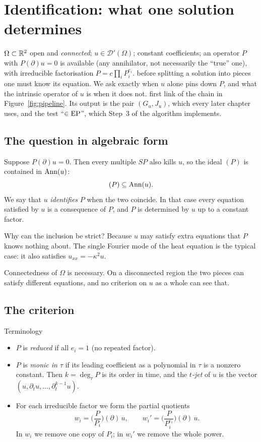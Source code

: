 \section{Identification: what one solution determines}\label{f:ch:ident}
\sectionbrief
{$\Omega\subset\mathbb{R}^2$ open and \emph{connected}; $u\in\mathcal D'(\Omega)$; constant coefficients; an operator $P$ with $P(\partial)u=0$ is available (any annihilator, not necessarily the ``true'' one), with irreducible factorisation $P=c\prod_iP_i^{e_i}$.}
{before splitting a solution into pieces one must know its equation. We ask exactly when $u$ alone pins down $P$, and what the intrinsic operator of $u$ is when it does not.}
{first link of the chain in Figure~\ref{fig:pipeline}. Its output is the pair $(G_u,J_u)$, which every later chapter uses, and the test ``$\in\mathrm{EP}$'', which Step~3 of the algorithm implements.}

\subsection{The question in algebraic form}

Suppose $P(\partial)u=0$. Then every multiple $SP$ also kills $u$, so the ideal $(P)$ is contained in $\operatorname{Ann}(u)$:
\[
(P)\subseteq\operatorname{Ann}(u).
\]
We say that $u$ \emph{identifies} $P$ when the two coincide. In that case every equation satisfied by $u$ is a consequence of $P$, and $P$ is determined by $u$ up to a constant factor.

Why can the inclusion be strict? Because $u$ may satisfy extra equations that $P$ knows nothing about. The single Fourier mode of the heat equation is the typical case: it also satisfies $u_{xx}=-\kappa^2u$.

Connectedness of $\Omega$ is necessary. On a disconnected region the two pieces can satisfy different equations, and no criterion on $u$ as a whole can see that.

\subsection{The criterion}

\begin{notebox}{Terminology}
\begin{itemize}
\item $P$ is \emph{reduced} if all $e_i=1$ (no repeated factor).
\item $P$ is \emph{monic in $\tau$} if its leading coefficient as a polynomial in $\tau$ is a nonzero constant. Then $k=\deg_\tau P$ is its order in time, and the \emph{$t$-jet} of $u$ is the vector $(u,\partial_tu,\dots,\partial_t^{k-1}u)$.
\item For each irreducible factor we form the partial quotients
\[
w_i=\Big(\frac{P}{P_i}\Big)(\partial)\,u,\qquad
w_i'=\Big(\frac{P}{P_i^{e_i}}\Big)(\partial)\,u .
\]
In $w_i$ we remove one copy of $P_i$; in $w_i'$ we remove the whole power.
\end{itemize}
\end{notebox}


